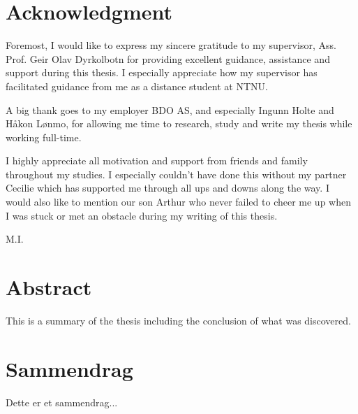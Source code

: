 \chapter*{Acknowledgment}
Foremost, I would like to express my sincere gratitude to my supervisor, Ass. Prof. Geir Olav Dyrkolbotn for providing excellent guidance, assistance and support during this thesis. I especially appreciate how my supervisor has facilitated guidance from me as a distance student at NTNU.

A big thank goes to my employer BDO AS, and especially Ingunn Holte and Håkon Lønmo, for allowing me time to research, study and write my thesis while working full-time.

I highly appreciate all motivation and support from friends and family throughout my studies. I especially couldn't have done this without my partner Cecilie which has supported me through all ups and downs along the way. I would also like to mention our son Arthur who never failed to cheer me up when I was stuck or met an obstacle during my writing of this thesis.

\begin{flushright}
M.I.\\[1pc]
\end{flushright}

\chapter*{Abstract}
\iffalse
LES "Scrutiny of the abstract" referert i Scrutiny of the introduction - http://sepwww.stanford.edu/sep/prof/Intro.html
\fi
This is a summary of the thesis including the conclusion of what was discovered.

\chapter*{Sammendrag}
\iffalse
LES "Scrutiny of the abstract" referert i Scrutiny of the introduction - http://sepwww.stanford.edu/sep/prof/Intro.html
\fi
Dette er et sammendrag...

\hypersetup{pageanchor=false}